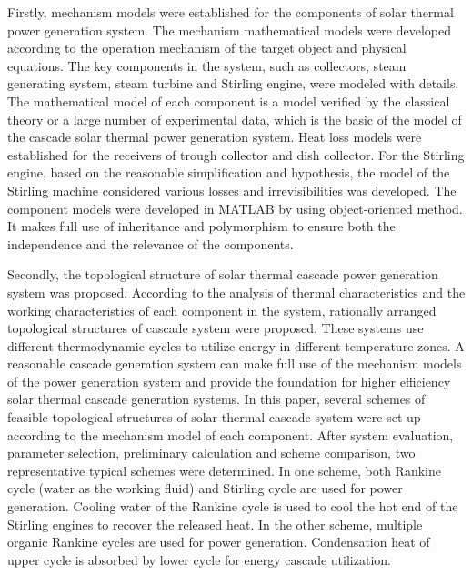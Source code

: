 {Firstly, mechanism models were established for the components of solar thermal power generation system. The mechanism mathematical models were developed according to the operation mechanism of the target object and physical equations. The key components in the system, such as collectors, steam generating system, steam turbine and Stirling engine, were modeled with details. The mathematical model of each component is a model verified by the classical theory or a large number of experimental data, which is the basic of the model of the cascade solar thermal power generation system. Heat loss models were established for the receivers of trough collector and dish collector. For the Stirling engine, based on the reasonable simplification and hypothesis, the model of the Stirling machine considered various losses and irrevisibilities was developed. The component models were developed in MATLAB by using object-oriented method. It makes full use of inheritance and polymorphism to ensure both the independence and the relevance of the components.

Secondly, the topological structure of solar thermal cascade power generation system was proposed. According to the analysis of thermal characteristics and the working characteristics of each component in the system, rationally arranged topological structures of cascade system were proposed. These systems use different thermodynamic cycles to utilize energy in different temperature zones. A reasonable cascade generation system can make full use of the mechanism models of the power generation system and provide the foundation for higher efficiency solar thermal cascade generation systems. In this paper, several schemes of feasible topological structures of solar thermal cascade system were set up according to the mechanism model of each component. After system evaluation, parameter selection, preliminary calculation and scheme comparison, two representative typical schemes were determined. In one scheme, both Rankine cycle (water as the working fluid) and Stirling cycle are used for power generation. Cooling water of the Rankine cycle is used to cool the hot end of the Stirling engines to recover the released heat. In the other scheme, multiple organic Rankine cycles are used for power generation. Condensation heat of upper cycle is absorbed by lower cycle for energy cascade utilization.

}
